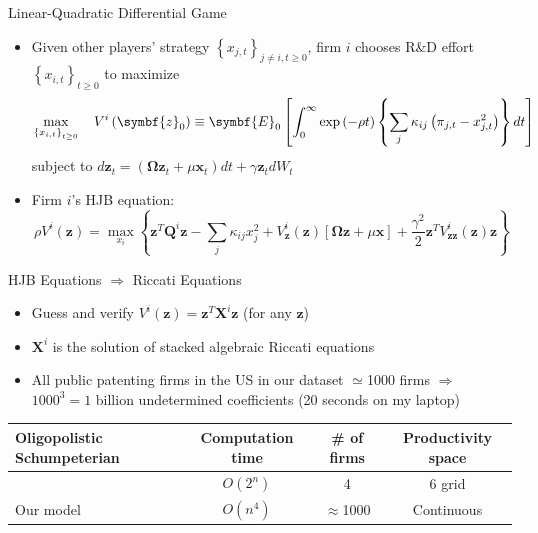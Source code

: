 \documentclass[
  aspectratio=169,  %
]{beamer}
\theoremstyle{plain}
\begin{document}
\begin{frame}{Linear-Quadratic Differential Game}

  \vspace{-1mm}

  \begin{itemize}
    \item Given other players' strategy $\left\{ x_{j,t}\right\} _{j\neq i,t\geq0}$,
          firm $i$ chooses R\&D effort $\left\{ x_{i,t}\right\} _{t\geq0}$
          to maximize
          \[
            \max_{\left\{ x_{i,t}\right\} _{t\geq0}}\quad V^{i}\left(\text{\ensuremath{\symbf{z}}}_{0}\right)\equiv\symbf{E}_{0}\left[\int_{0}^{\infty}\exp\left(-\rho t\right)\left\{ \sum_{j}\kappa_{ij}\left(\pi_{j,t}-x_{j,t}^{2}\right)\right\} dt\right]
          \]
          subject to $d\symbf{z}_{t}=\left(\symbf{\Omega}\symbf{z}_{t}+\mu\symbf{x}_{t}\right)dt+\gamma\symbf{z}_{t}dW_{t}$\medskip{}
    \item Firm $i$'s HJB equation:
          \[
            \rho V^{i}\left(\symbf{z}\right)=\max_{x_{i}}\left\{ \symbf{z}^{T}\symbf{Q}^{i}\symbf{z}-\sum_{j}\kappa_{ij}x_{j}^{2}+V_{\symbf{z}}^{i}\left(\symbf{z}\right)\left[\symbf{\Omega}\symbf{z}+\mu\symbf{x}\right]+\frac{\gamma^{2}}{2}\symbf{z}^{T}V_{\symbf{zz}}^{i}\left(\symbf{z}\right)\symbf{z}\right\}
          \]
  \end{itemize}
\end{frame}
%
\begin{frame}{HJB Equations $\Longrightarrow$ Riccati Equations}

  \label{hjb}
  \begin{itemize}
    \item Guess and verify $V^{i}\left(\symbf{z}\right)=\symbf{z}^{T}\symbf{X}^{i}\symbf{z}$
          (for any $\symbf{z}$)
    \item $\symbf{X}^{i}$ is the solution of stacked algebraic Riccati equations \hyperlink{riccati}{}
    \item All public patenting firms in the US in our dataset $\simeq$1000
          firms $\Longrightarrow$ \\
          $1000^{3}=1$ billion undetermined coefficients (20 seconds on my laptop)\medskip{}
  \end{itemize}
  \begin{center}
    \begin{tabular}{@{}p{5cm}ccc@{}}
      \toprule
      Oligopolistic Schumpeterian                                       & Computation time & \# of firms    & Productivity space \\
      \midrule
      \citet{Cavenaile2023-lo}                    & $O(2^n)$         & 4              & 6 grid       \\
      Our model                                   & $O(n^4)$         & $\approx$1000  & Continuous         \\
      \bottomrule
    \end{tabular}
  \end{center}

\end{frame}
\end{document}
